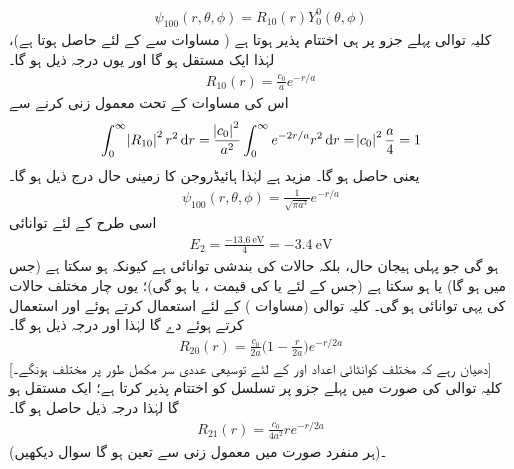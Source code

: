  \begin{align}
\psi_{100}(r,\theta,\phi)=R_{10}(r)Y_{0}^{0}(\theta,\phi) 
\end{align}
 کلیہ توالی پہلے جزو پر ہی اختتام پذیر ہوتا ہے ( مساوات  سے  کے لئے  حاصل ہوتا ہے)، لہٰذا  ایک مستقل  ہو گا اور یوں درجہ ذیل ہو گا۔
 \begin{align}
R_{10}(r)=\frac{c_{0}}{a}e^{-r/a} 
\end{align}
 اس کی مساوات  کے تحت معمول زنی کرنے سے
\begin{align*}
\int_{0}^{\infty}\abs{R_{10}}^{2}r^{2}\dif{r}=\frac{\abs{c_0}^{2}}{a^{2}}\int_{0}^{\infty}e^{-2r/a}r^{2}\dif{r}=\abs{c_{0}}^{2}\frac{a}{4}=1 
\end{align*}
یعنی  حاصل ہو گا۔ مزید  ہے لہٰذا ہائیڈروجن کا زمینی حال درج ذیل ہو گا۔
\begin{align}\label{مساوات_تین_ابعاد_زمینی_ہائیڈروجن}
\psi_{100}(r,\theta,\phi)=\frac{1}{\sqrt{\pi a^{3}}}e^{-r/a} 
\end{align}
اسی طرح  کے لئے توانائی
\begin{align}
E_{2}=\frac{\SI{-13.6}{\electronvolt}}{4}=\SI{-3.4}{\electronvolt}
\end{align}
ہو گی جو پہلی ہیجان حال، بلکہ حالات کی بندشی توانائی ہے کیونکہ  ہو سکتا ہے (جس میں  ہو گا) یا  ہو سکتا ہے (جس کے لئے یا  کی قیمت ،  یا  ہو گی)؛ یوں چار مختلف حالات کی یہی توانائی ہو گی۔
 کلیہ توالی (مساوات )  کے لئے  استعمال کرتے ہوئے  اور  استعمال کرتے ہوئے  دے گا لہٰذا  اور درجہ ذیل ہو گا۔
 \begin{align}\label{مساوات_تین_ابعادی_رداسی_بیس}
R_{20}(r)=\frac{c_{0}}{2a}\big(1-\frac{r}{2a}\big)e^{-r/2a} 
\end{align}
[دھیان رہے کہ مختلف کوانٹائی اعداد  اور  کے لئے توسیعی عددی سر  مکمل طور پر مختلف ہونگے۔] کلیہ توالی 
  کی صورت میں پہلے جزو پر تسلسل کو اختتام پذیر کرتا ہے؛  ایک مستقل ہو گا لہٰذا درجہ ذیل حاصل ہو گا۔
 \begin{align}\label{مساوات_تین_ابعادی_رداسی_اکیس}
R_{21}(r)=\frac{c_{0}}{4a^{2}}re^{-r/2a} 
\end{align}
(ہر منفرد صورت میں  معمول زنی سے تعین ہو گا سوال  دیکھیں)۔

